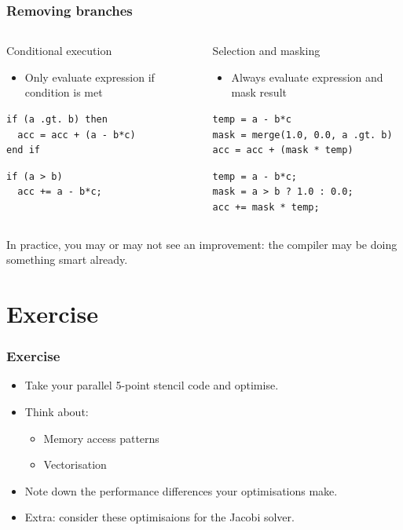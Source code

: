 \documentclass{beamer}
\begin{document}
\begin{frame}[fragile]
\frametitle{Removing branches}
\begin{columns}

\begin{column}{0.5\textwidth}
Conditional execution
\begin{itemize}
  \item Only evaluate expression if condition is met
\end{itemize}
\begin{verbatim}
if (a .gt. b) then
  acc = acc + (a - b*c)
end if
\end{verbatim}

\begin{verbatim}
if (a > b)
  acc += a - b*c;
\end{verbatim}
\end{column}

\begin{column}{0.5\textwidth}
Selection and masking
\begin{itemize}
  \item Always evaluate expression and mask result
\end{itemize}
\begin{verbatim}
temp = a - b*c
mask = merge(1.0, 0.0, a .gt. b)
acc = acc + (mask * temp)
\end{verbatim}

\begin{verbatim}
temp = a - b*c;
mask = a > b ? 1.0 : 0.0;
acc += mask * temp;
\end{verbatim}
\end{column}

\end{columns}
In practice, you may or may not see an improvement: the compiler may be doing something smart already.
\end{frame}

\section{Exercise}
\begin{frame}
\frametitle{Exercise}
\begin{itemize}
  \item Take your parallel 5-point stencil code and optimise.
  \item Think about:
    \begin{itemize}
      \item Memory access patterns
      \item Vectorisation
    \end{itemize}
  \item Note down the performance differences your optimisations make.
  \item Extra: consider these optimisaions for the Jacobi solver.
\end{itemize}
\end{frame}

\end{document}

